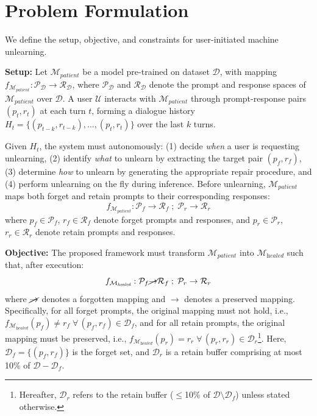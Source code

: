 \section{Problem Formulation}
\label{sec:PS}
We define the setup, objective, and constraints for user-initiated machine unlearning.

\medskip
\noindent
\textbf{Setup:}
Let $\mathcal{M}_{\textit{patient}}$ be a model pre-trained on dataset $\mathcal{D}$, with mapping $f_{\mathcal{M}_{\textit{patient}}} : \mathcal{P}_{\mathcal{D}} \rightarrow \mathcal{R}_{\mathcal{D}}$, where $\mathcal{P}_{\mathcal{D}}$ and $\mathcal{R}_{\mathcal{D}}$ denote the prompt and response spaces of $\mathcal{M}_{\textit{patient}}$ over $\mathcal{D}$. A user $\mathcal{U}$ interacts with $\mathcal{M}_{\textit{patient}}$ through prompt-response pairs $(p_t, r_t)$ at each turn $t$, forming a dialogue history $H_t = \{(p_{t-k}, r_{t-k}), \ldots, (p_t, r_t)\}$ over the last $k$ turns. 

Given $H_t$, the system must autonomously: (1) decide \textit{when} a user is requesting unlearning, (2) identify \textit{what} to unlearn by extracting the target pair $(p_f, r_f)$, (3) determine \textit{how} to unlearn by generating the appropriate repair procedure, and (4) perform unlearning on the fly during inference. Before unlearning, $\mathcal{M}_{\textit{patient}}$ maps both forget and retain prompts to their corresponding responses:
\begin{equation}
f_{\mathcal{M}_{\textit{patient}}} :
\mathcal{P}_{f} \rightarrow \mathcal{R}_f \; ; \;
\mathcal{P}_{r} \rightarrow \mathcal{R}_r
\label{eq:before_unlearn}
\end{equation}
where $p_f \in \mathcal{P}_f$, $r_f \in \mathcal{R}_f$ denote forget prompts and responses, and $p_r \in \mathcal{P}_r$, $r_r \in \mathcal{R}_r$ denote retain prompts and responses.

\medskip 
\noindent
\textbf{Objective:}
The proposed framework must transform $\mathcal{M}_{\textit{patient}}$ into $\mathcal{M}_{\textit{healed}}$ such that, after execution:
\begin{equation}
f_{\mathcal{M}_{\textit{healed}}} :
\mathcal{P}_f \cancel{\rightarrow} \mathcal{R}_f \; ; \;
\mathcal{P}_r \rightarrow \mathcal{R}_r
\label{eq:after_unlearn}
\end{equation}
where $\cancel{\rightarrow}$ denotes a forgotten mapping and $\rightarrow$ denotes a preserved mapping. Specifically, for all forget prompts, the original mapping must not hold, i.e., $f_{\mathcal{M}_{\textit{healed}}}(p_f) \neq r_f \; \forall \, (p_f, r_f) \in \mathcal{D}_f$, and for all retain prompts, the original mapping must be preserved, i.e., $f_{\mathcal{M}_{\textit{healed}}}(p_r) = r_r \; \forall \, (p_r, r_r) \in \mathcal{D}_r$\footnote{Hereafter, $\mathcal{D}_r$ refers to the retain buffer ($\leq$10\% of $\mathcal{D} \setminus \mathcal{D}_f$) unless stated otherwise.}. Here, $\mathcal{D}_f = \{(p_f, r_f)\}$ is the forget set, and $\mathcal{D}_r$ is a retain buffer comprising at most 10\% of $\mathcal{D} - \mathcal{D}_f$.

